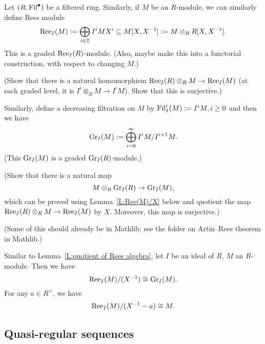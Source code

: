 	\begin{definition}
		Let $(R, \mathrm{Fil}^\bullet)$ be a filtered ring. 
		Similarly, if $M$ be an $R$-module, we can similarly define Rees module
		$$
		\mathrm{Ree}_I(M): = \bigoplus_{i \in \mathbb{Z}} I^iMX^i \subseteq M[X, X^{-1}]: = M \otimes_R R[X, X^{-1}].
		$$
		This is a graded $\mathrm{Ree}_I(R)$-module.
		(Also, maybe make this into a functorial construction, with respect to changing $M$.)
		
		(Show that there is a natural homomorphism $\mathrm{Ree}_I(R) \otimes_R M \to \mathrm{Ree}_I(M)$ (at each graded level, it is $I^i \otimes_R M \to I^iM$). Show that this is surjective.)
		
		Similarly, define a decreasing filtration on $M$ by $\mathrm{Fil}^i_I(M): = I^iM, i \ge 0$ and then we have
		$$
		\mathrm{Gr}_I(M) := \bigoplus_{i=0}^{\infty} I^iM/I^{i+1}M.
		$$
		(This $\mathrm{Gr}_I(M)$ is a graded $\mathrm{Gr}_I(R)$-module.)
		
		(Show that there is a natural map 
		\begin{equation}
			\label{E:M otimes R GrIR to GrI(M)}
			M \otimes_R \mathrm{Gr}_I(R) \to \mathrm{Gr}_I(M),
		\end{equation}
		which can be proved using Lemma~\ref{L:Ree(M)/X} below and quotient the map $\mathrm{Ree}_I(R) \otimes_RM \to \mathrm{Ree}_I(M)$ by $X$. Moreover, this map is surjective.)
		
		(Some of this should already be in Mathlib; see the folder on Artin--Rees theorem in Mathlib.)
	\end{definition}
	
	\begin{lemma}
		\label{L:Ree(M)/X}
		Similar to Lemma~\ref{L:quotient of Rees algebra}, let $I$ be an ideal of $R$, $M$ an $R$-module. Then we have
		$$
		\mathrm{Ree}_I(M) / (X ^ {-1}) \cong \mathrm{Gr}_I(M).
		$$
		For any $a \in R^\times$, we have
		$$
		\mathrm{Ree}_I(M)/(X^{-1}-a) \cong M.
		$$
		
	\end{lemma}
	
	
	
	\subsection{Quasi-regular sequences}
	
	
	
